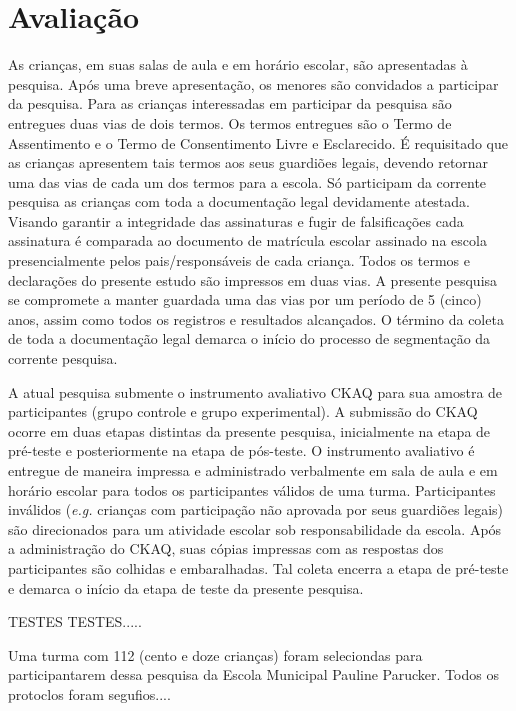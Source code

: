 \chapter{Avaliação}\label{ch:Avaliacao}


As crianças, em suas salas de aula e em horário escolar, são apresentadas à pesquisa. Após uma breve apresentação, os menores são convidados a participar da pesquisa. Para as crianças interessadas em participar da pesquisa são entregues duas vias de dois termos. Os termos entregues são o Termo de Assentimento e o Termo de Consentimento Livre e Esclarecido. É requisitado que as crianças apresentem tais termos aos seus guardiões legais, devendo retornar uma das vias de cada um dos termos para a escola. Só participam da corrente pesquisa as crianças com toda a documentação legal devidamente atestada. Visando garantir a integridade das assinaturas e fugir de falsificações cada assinatura é comparada ao documento de matrícula escolar assinado na escola presencialmente pelos pais/responsáveis de cada criança. Todos os termos e declarações do presente estudo são impressos em duas vias. A presente pesquisa se compromete a manter guardada uma das vias por um período de 5 (cinco) anos, assim como todos os registros e resultados alcançados. O término da coleta de toda a documentação legal demarca o início do processo de segmentação da corrente pesquisa. 


A atual pesquisa submente o instrumento avaliativo \ac{CKAQ} para sua amostra de participantes (grupo controle e grupo experimental). A submissão do \ac{CKAQ} ocorre em duas etapas distintas da presente pesquisa, inicialmente na etapa de pré-teste e posteriormente na etapa de pós-teste. O instrumento avaliativo é entregue de maneira impressa e administrado verbalmente em sala de aula e em horário escolar para todos os participantes válidos de uma turma. Participantes inválidos (\textit{e.g.} crianças com participação não aprovada por seus guardiões legais) são direcionados para um atividade escolar sob responsabilidade da escola. Após a administração do \ac{CKAQ}, suas cópias impressas com as respostas dos participantes são colhidas e embaralhadas. Tal coleta encerra a etapa de pré-teste e demarca o início da etapa de teste da presente pesquisa.



TESTES TESTES.....

Uma turma com 112 (cento e doze crianças) foram seleciondas para participantarem dessa pesquisa da Escola Municipal Pauline Parucker. Todos os protoclos foram segufios....